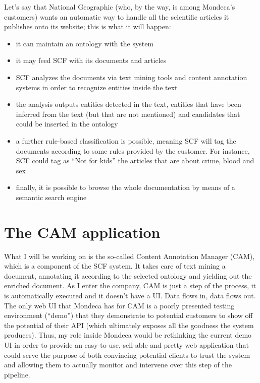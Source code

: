 \documentclass[12pt,oneside,svgnames]{memoir}
\begin{document}
Let's say that National Geographic (who, by the way, is among Mondeca's
customers) wants an automatic way to handle all the scientific articles
it publishes onto its website; this is what it will happen:

\begin{itemize}
\itemsep1pt\parskip0pt
\item
  it can maintain an ontology with the system
\item
  it may feed SCF with its documents and articles
\item
  SCF analyzes the documents via text mining tools and content
  annotation systems in order to recognize entities inside the text
\item
  the analysis outputs entities detected in the text, entities that have
  been inferred from the text (but that are not mentioned) and
  candidates that could be inserted in the ontology
\item
  a further rule-based classification is possible, meaning SCF will tag
  the documents according to some rules provided by the customer. For
  instance, SCF could tag as ``Not for kids'' the articles that are
  about crime, blood and sex
\item
  finally, it is possible to browse the whole documentation by means of
  a semantic search engine
\end{itemize}

\section{The CAM application}\label{the-cam-application}

What I will be working on is the so-called Content Annotation Manager
(CAM), which is a component of the SCF system. It takes care of text
mining a document, annotating it according to the selected ontology and
yielding out the enriched document. As I enter the company, CAM is just
a step of the process, it is automatically executed and it doesn't have
a UI. Data flows in, data flows out. The only web UI that Mondeca has
for CAM is a poorly presented testing environment (``demo'') that they
demonstrate to potential customers to show off the potential of their
API (which ultimately exposes all the goodness the system produces).
Thus, my role inside Mondeca would be rethinking the current demo UI in
order to provide an easy-to-use, sell-able and pretty web application
that could serve the purpose of both convincing potential clients to
trust the system and allowing them to actually monitor and intervene
over this step of the pipeline.
\end{document}
